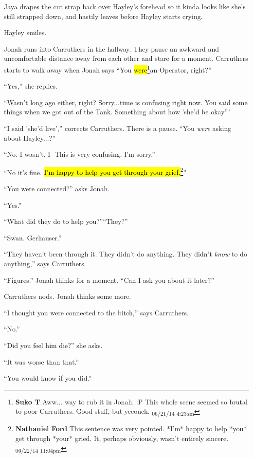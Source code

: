 Jaya drapes the cut strap back over Hayley's forehead so it kinda looks like she's still strapped down, and hastily leaves before Hayley starts crying.

Hayley smiles.





Jonah runs into Carruthers in the hallway.  They pause an awkward and uncomfortable distance away from each other and stare for a moment.   Carruthers starts to walk away when Jonah says ``You \hl{were}\footnote{\textbf{Suko T }Aww... way to rub it in Jonah. :P  This whole scene seemed so brutal to poor Carruthers.  Good stuff, but yeeouch. \textsubscript{06/21/14 4:23am}}an Operator, right?''

``Yes,'' she replies.

``Wasn't long ago either, right?  Sorry...time is confusing right now.  You said some things when we got out of the Tank.  Something about how 'she'd be okay'''

``I said 'she'd live','' corrects Carruthers.  There is a pause.  ``You \textit{were }asking about Hayley...?''

``No.  I wasn't.  I- This is very confusing.  I'm sorry.''

``No it's fine. \hl{I'm happy to help you get through your grief.}\footnote{\textbf{Nathaniel Ford }This sentence was very pointed. *I'm* happy to help *you* get through *your* gried. It, perhaps obviously, wasn't entirely sincere. \textsubscript{06/22/14 11:04pm}}''

``You were connected?'' asks Jonah.

``Yes.''

``What did they do to help you?''``They?''

``Swan.  Gerhauser.''

``They haven't been through it.  They didn't do anything.  They didn't \textit{know }to do anything,'' says Carruthers.

``Figures.''  Jonah thinks for a moment.  ``Can I ask you about it later?''

Carruthers nods.   Jonah thinks some more.

``I thought you were connected to the bitch,'' says Carruthers.

``No.''

``Did you feel him die?'' she asks.

``It was worse than that.''

``You would know if you did.''

